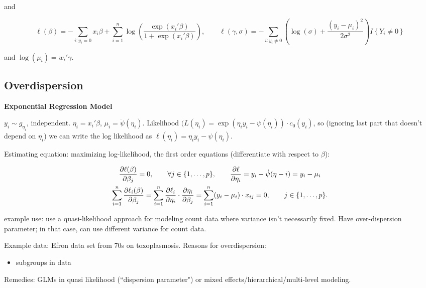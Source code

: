 and 

\[
\ell(\beta) =- \sum_{i: y_i = 0} x_i \beta + \sum_{i=1}^n \log \left( \frac{\exp(x_i' \beta)}{1 + \exp (x_i' \beta)} \right), \qquad \ell(\gamma, \sigma) = - \sum_{i: y_i \neq 0}  \left( \log(\sigma) + \frac{(y_i - \mu_i)^2}{2 \sigma^2} \right) I\left\{ Y_i \neq 0  \right\}
\]

and \(\log(\mu_i) = w_i ' \gamma\).


\subsection{Overdispersion}

\textbf{Exponential Regression Model}


\(y_i \sim g_{\eta_i}\), independent. \(\eta_i = x_i' \beta\), \(\mu_i = \dot{\psi}(\eta_i)\). Likelihood \((L(\eta_i) = \exp(\eta_i y_i - \psi(\eta_i)) \cdot c_0(y_i)\), so (ignoring last part that doesn't depend on \(\eta_i\)) we can write the log likelihood as \(\ell(\eta_i) = \eta_i y_i - \psi(\eta_i)\). 

Estimating equation: maximizing log-likelihood, the first order equations (differentiate with respect to \(\beta\)):

\begin{multline*}
\frac{\partial \ell(\beta)}{\partial \beta_j} = 0 , \qquad \forall j \in \{1, \ldots, p\}, \qquad \frac{\partial \ell}{\partial \eta_i} = y_i - \dot{\psi}(\eta-i) = y_i - \mu_i
\\ \sum_{i=1}^n \frac{\partial \ell_i(\beta)}{\partial \beta_j} = \sum_{i=1}^n \frac{\partial \ell_i}{\partial \eta_i} \cdot \frac{\partial \eta_i}{\partial \beta_j} = \sum_{i=1}^n (y_i - \mu_i) \cdot x_{ij} = 0 , \qquad j \in\{1, \ldots, p\}.
\end{multline*}

example use: use a quasi-likelihood approach for modeling count data where variance isn't necessarily fixed. Have over-dispersion parameter; in that case, can use different variance for count data.

Example data: Efron data set from 70s on toxoplasmosis. Reasons for overdispersion:

\begin{itemize}

\item subgroups in data

\end{itemize}

Remedies: GLMs in quasi likelihood (``dispersion parameter") or mixed effects/hierarchical/multi-level modeling.

